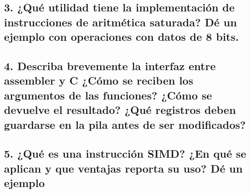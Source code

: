 \documentclass[10pt,a4paper,twoside,spanish]{article}	%
\begin{document}
\subsection*{3. ¿Qué utilidad tiene la implementación de instrucciones de aritmética saturada? Dé un ejemplo con operaciones con datos de 8 bits.}

\subsection*{4. Describa brevemente la interfaz entre assembler y C ¿Cómo se reciben los argumentos de las funciones? ¿Cómo se devuelve el resultado? ¿Qué registros deben guardarse en la pila antes de ser modificados?}

\subsection*{5. ¿Qué es una instrucción SIMD? ¿En qué se aplican y que ventajas reporta su uso? Dé un ejemplo}
\end{document}
